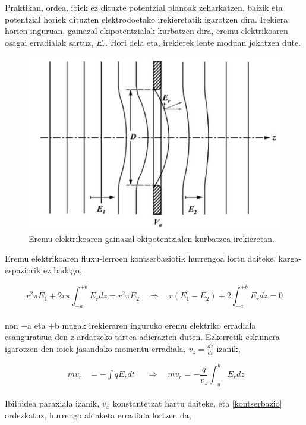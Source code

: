 \documentclass[12pt]{article}
\numberwithin{figure}{section}
\numberwithin{equation}{section}
\begin{document}
Praktikan, ordea, ioiek ez dituzte potentzial planoak zeharkatzen, baizik eta potentzial horiek dituzten elektrodoetako irekieretatik igarotzen dira. Irekiera horien inguruan, gainazal-ekipotentzialak kurbatzen dira, eremu-elektrikoaren osagai erradialak sartuz, $E_r$. Hori dela eta, irekierek lente moduan jokatzen dute.

\begin{figure}[h]
    \centering
    \includegraphics[width=0.8\linewidth]{2 - Oinarri teorikoa/aperture_lens.png}
    \caption{Eremu elektrikoaren gainazal-ekipotentzialen kurbatzea irekieretan.}
    \label{fig:enter-label}
\end{figure}

Eremu elektrikoaren fluxu-lerroen kontserbaziotik hurrengoa lortu daiteke, karga\hyp{}espaziorik ez badago,

\begin{equation}
    r^2 \pi E_1 + 2 r \pi \int_{-a}^{+b} E_r dz=r^2 \pi E_2 \quad \Longrightarrow \quad r(E_1-E_2)+2\int_{-a}^{+b} E_r dz=0
    \label{kontserbazio}
\end{equation}
\\
non −a eta +b mugak irekieraren inguruko eremu elektriko erradiala esanguratsua den z ardatzeko tartea adierazten duten. Ezkerretik eskuinera igarotzen den ioiek jasandako momentu erradiala, $v_z =\frac{dz}{dt}$ izanik,

\begin{equation}
    \begin{aligned}
    mv_r&= -\int qE_rdt
    \end{aligned}
    \quad \Longrightarrow \quad
    mv_r = -\frac{q}{v_z}\int_{-a}^b E_r dz
\end{equation}\\

Ibilbidea paraxiala izanik, $v_x$ konstantetzat hartu daiteke, eta \eqref{kontserbazio} ordezkatuz, hurrengo aldaketa erradiala lortzen da,
\end{document}
